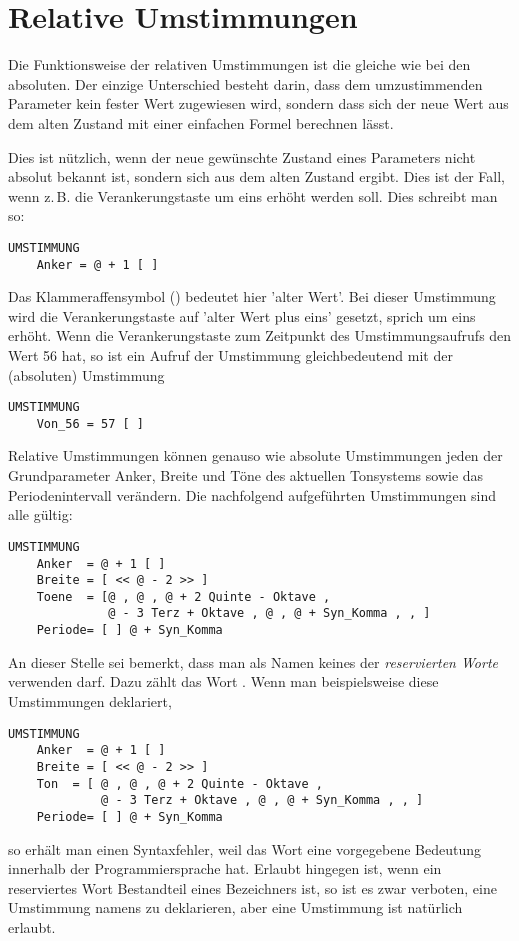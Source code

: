 \section{Relative Umstimmungen}\label{sec:relat-umst}
Die Funktionsweise der relativen Umstimmungen ist die gleiche wie
bei den absoluten. Der einzige Unterschied besteht darin, dass dem
umzustimmenden Parameter kein fester Wert zugewiesen wird, sondern
dass sich der neue Wert aus dem alten Zustand mit einer einfachen Formel
berechnen lässt.

Dies ist nützlich, wenn der neue gewünschte Zustand eines Parameters
nicht absolut bekannt ist, sondern sich aus dem alten Zustand ergibt.
Dies ist der Fall, wenn z.\,B. die Verankerungstaste um eins erhöht
werden soll. Dies schreibt man so:
\begin{verbatim}
UMSTIMMUNG
    Anker = @ + 1 [ ]
\end{verbatim}
Das Klammeraffensymbol () bedeutet hier 'alter Wert'. Bei dieser
Umstimmung wird die Verankerungstaste auf 'alter Wert plus
eins' gesetzt, sprich um eins erhöht.
Wenn die Verankerungstaste zum Zeitpunkt des Umstimmungsaufrufs
den Wert 56 hat, so ist ein Aufruf der Umstimmung 
gleichbedeutend mit der (absoluten) Umstimmung
\begin{verbatim}
UMSTIMMUNG
    Von_56 = 57 [ ]
\end{verbatim}
Relative Umstimmungen können genauso wie absolute Umstimmungen jeden
der Grundparameter Anker, Breite und Töne des aktuellen Tonsystems
sowie das Periodenintervall verändern. Die nachfolgend aufgeführten
Umstimmungen sind alle gültig:
\begin{verbatim}
UMSTIMMUNG
    Anker  = @ + 1 [ ]
    Breite = [ << @ - 2 >> ]
    Toene  = [@ , @ , @ + 2 Quinte - Oktave ,
              @ - 3 Terz + Oktave , @ , @ + Syn_Komma , , ]
    Periode= [ ] @ + Syn_Komma
\end{verbatim}
An dieser Stelle sei bemerkt, dass man als Namen keines der {\itshape
reservierten Worte} verwenden darf. Dazu zählt das Wort .
Wenn man beispielsweise diese Umstimmungen deklariert,
\begin{verbatim}
UMSTIMMUNG
    Anker  = @ + 1 [ ]
    Breite = [ << @ - 2 >> ]
    Ton  = [ @ , @ , @ + 2 Quinte - Oktave ,
             @ - 3 Terz + Oktave , @ , @ + Syn_Komma , , ]
    Periode= [ ] @ + Syn_Komma
\end{verbatim}
so erhält man einen Syntaxfehler, weil das Wort  eine
vorgegebene Bedeutung innerhalb der Programmiersprache hat. Erlaubt
hingegen ist, wenn ein reserviertes Wort Bestandteil eines Bezeichners
ist, so ist es zwar verboten, eine Umstimmung namens  zu
deklarieren, aber eine Umstimmung  ist natürlich
erlaubt.

